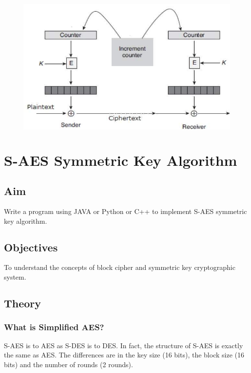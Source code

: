 \documentclass[openany]{book}
\begin{document}
\begin{enumerate}
\begin{enumerate}
		            \begin{figure}[H]
			            \centering
			            \includegraphics[scale=0.5]{ctr_mode.jpg}
			            \caption{}
		            \end{figure}
	      \end{enumerate}
\end{enumerate}


\chapter{S-AES Symmetric Key Algorithm}
\section{Aim}
Write a program using JAVA or Python or C++ to implement S-AES symmetric key
algorithm.

\section{Objectives}
To understand the concepts of block cipher and symmetric key cryptographic
system.

\section{Theory}

\subsection{What is Simplified AES?}
S-AES is to AES as S-DES is to DES. In fact, the structure of S-AES is exactly the
same as AES. The differences are in the key size (16 bits), the block size (16 bits) and the number
of rounds (2 rounds).
\end{document}
